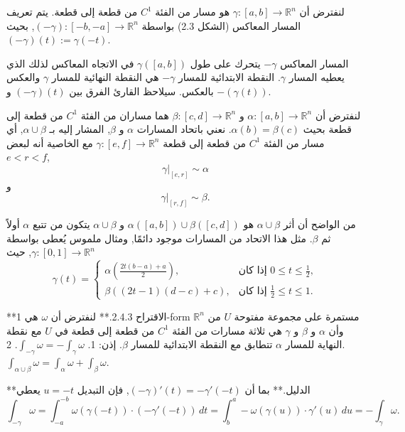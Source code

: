 \begin{definition}
لنفترض أن \( \gamma : [a, b] \to \mathbb{R}^n \) هو مسار من الفئة \( C^1 \) من قطعة إلى قطعة. يتم تعريف المسار المعاكس (الشكل 2.3) بواسطة \( (-\gamma) : [−b, −a] \to \mathbb{R}^n \), بحيث \( (-\gamma)(t) := \gamma(−t) \).
\end{definition}

المسار المعاكس \( -\gamma \) يتحرك على طول \( \gamma([a, b]) \) في الاتجاه المعاكس لذلك الذي يعطيه المسار \( \gamma \). النقطة الابتدائية للمسار \( -\gamma \) هي النقطة النهائية للمسار \( \gamma \) والعكس بالعكس. سيلاحظ القارئ الفرق بين \( (-\gamma)(t) \) و \( -(\gamma(t)) \).

\begin{definition}
لنفترض أن \( \alpha : [a, b] \to \mathbb{R}^n \) و \( \beta : [c, d] \to \mathbb{R}^n \) هما مساران من الفئة \( C^1 \) من قطعة إلى قطعة بحيث \( \alpha(b) = \beta(c) \). نعني باتحاد المسارات \( \alpha \) و \( \beta \), المشار إليه بـ \( \alpha \cup \beta \), أي مسار من الفئة \( C^1 \) من قطعة إلى قطعة \( \gamma : [e, f] \to \mathbb{R}^n \) مع الخاصية أنه لبعض \( e < r < f \),
\[ \gamma|_{[e, r]} \sim \alpha \] و \[ \gamma|_{[r, f]} \sim \beta. \]
\end{definition}

من الواضح أن أثر \( \alpha \cup \beta \) هو \( \alpha([a, b]) \cup \beta([c, d]) \) و \( \alpha \cup \beta \) يتكون من تتبع \( \alpha \) أولاً ثم \( \beta \). مثل هذا الاتحاد من المسارات موجود دائمًا, ومثال ملموس يُعطى بواسطة \( \gamma : [0, 1] \to \mathbb{R}^n \), حيث
\[ \gamma(t) = \begin{cases} 
\alpha\left(\frac{2t(b - a) + a}{2}\right), & \text{إذا كان } 0 \leq t \leq \frac{1}{2}, \\
\beta\left((2t - 1)(d - c) + c\right), & \text{إذا كان } \frac{1}{2} \leq t \leq 1.
\end{cases} \]

**الاقتراح 2.4.3.**
لنفترض أن \( \omega \) هي 1-form مستمرة على مجموعة مفتوحة \( U \) من \( \mathbb{R}^n \) وأن \( \alpha \) و \( \beta \) و \( \gamma \) هي ثلاثة مسارات من الفئة \( C^1 \) من قطعة إلى قطعة في \( U \) مع نقطة النهاية للمسار \( \alpha \) تتطابق مع النقطة الابتدائية للمسار \( \beta \). إذن:
1. \( \int_{-\gamma} \omega = -\int_\gamma \omega \).
2. \( \int_{\alpha \cup \beta} \omega = \int_\alpha \omega + \int_\beta \omega \).

**الدليل.**
بما أن \( (-\gamma)'(t) = -\gamma'(-t) \), فإن التبديل \( u = -t \) يعطي
\[ \int_{-\gamma} \omega = \int_{-a}^{-b} \omega(\gamma(-t)) \cdot (-\gamma'(-t)) \, dt = \int_{b}^{a} -\omega(\gamma(u)) \cdot \gamma'(u) \, du = -\int_\gamma \omega. \]

